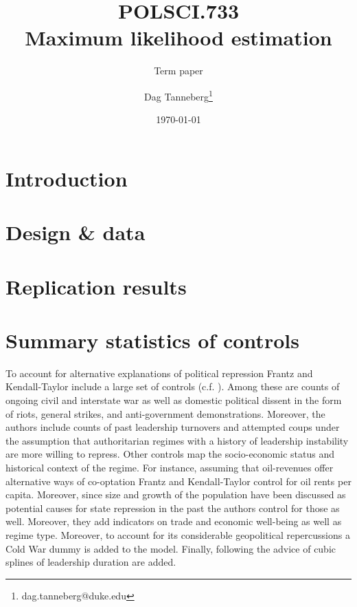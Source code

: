 \documentclass[parskip=half]{scrartcl}\usepackage[]{graphicx}\usepackage[]{color}
\title{POLSCI.733\\Maximum likelihood estimation}
\subtitle{Term paper}
\author{Dag Tanneberg\thanks{%
    dag.tanneberg@duke.edu
  }
}
\date{\today}
\begin{document}
 
\linenumbers

\maketitle
\thispagestyle{empty}
\tableofcontents
\newpage

\section{Introduction}








\section{Design \& data}






\section{Replication results}
%
%


\newpage
\appendix
\section{Summary statistics of controls}



To account for alternative explanations of political 
repression Frantz and Kendall-Taylor include a large set
of controls (c.f. \cite[338f.]{Frantz.2014}). Among these 
are counts of ongoing civil and interstate war as well as 
domestic political dissent in the form of riots, general 
strikes, and anti-government demonstrations. Moreover, the 
authors include counts of past leadership turnovers and 
attempted coups under the assumption that authoritarian 
regimes with a history of leadership instability are more 
willing to repress. Other controls map the socio-economic 
status and historical context of the regime. For instance, 
assuming that oil-revenues offer alternative ways of 
co-optation Frantz and Kendall-Taylor control for oil rents 
per capita. Moreover, since size and growth of the 
population have been discussed as potential causes for state
repression in the past the authors control for those as 
well. Moreover, they add indicators on trade and economic 
well-being as well as regime type. Moreover, to account for 
its considerable geopolitical repercussions a Cold War dummy
is added to the model. Finally, following the advice of 
\citet{Carter.2010} cubic splines of leadership duration are
added. 



\newpage
{}
\printbibliography
\end{document}
